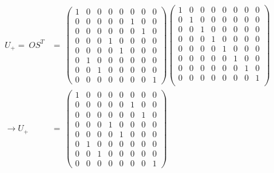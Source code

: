 \begin{equation}
    \begin{split}
        U_{+} =\ OS^T &=\ \begin{pmatrix}
        1 & 0 & 0 & 0 & 0 & 0 & 0 & 0\\
        0 & 0 & 0 & 0 & 0 & 1 & 0 & 0\\
        0 & 0 & 0 & 0 & 0 & 0 & 1 & 0\\
        0 & 0 & 0 & 1 & 0 & 0 & 0 & 0\\
        0 & 0 & 0 & 0 & 1 & 0 & 0 & 0\\
        0 & 1 & 0 & 0 & 0 & 0 & 0 & 0\\
        0 & 0 & 1 & 0 & 0 & 0 & 0 & 0\\
        0 & 0 & 0 & 0 & 0 & 0 & 0 & 1
        \end{pmatrix}\begin{pmatrix}
         1 & 0 & 0 & 0 & 0 & 0 & 0 & 0\\
         0 & 1 & 0 & 0 & 0 & 0 & 0 & 0\\ 
         0 & 0 & 1 & 0 & 0 & 0 & 0 & 0\\
         0 & 0 & 0 & 1 & 0 & 0 & 0 & 0\\
         0 & 0 & 0 & 0 & 1 & 0 & 0 & 0\\
         0 & 0 & 0 & 0 & 0 & 1 & 0 & 0\\
         0 & 0 & 0 & 0 & 0 & 0 & 1 & 0\\
         0 & 0 & 0 & 0 & 0 & 0 & 0 & 1\\
        \end{pmatrix} \\ 
        \rightarrow U_{+} &=\ \begin{pmatrix}
        1 & 0 & 0 & 0 & 0 & 0 & 0 & 0\\
        0 & 0 & 0 & 0 & 0 & 1 & 0 & 0\\
        0 & 0 & 0 & 0 & 0 & 0 & 1 & 0\\
        0 & 0 & 0 & 1 & 0 & 0 & 0 & 0\\
        0 & 0 & 0 & 0 & 1 & 0 & 0 & 0\\
        0 & 1 & 0 & 0 & 0 & 0 & 0 & 0\\
        0 & 0 & 1 & 0 & 0 & 0 & 0 & 0\\
        0 & 0 & 0 & 0 & 0 & 0 & 0 & 1
        \end{pmatrix}
    \end{split}
    \label{equation:addition_matrix_solved}
\end{equation}
\newpage

